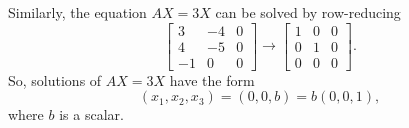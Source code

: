 \begin{solution}
  Similarly, the equation $AX = 3X$ can be solved by row-reducing
  \begin{equation*}
    \begin{bmatrix}
      3 & -4 & 0 \\
      4 & -5 & 0 \\
      -1 & 0 & 0
    \end{bmatrix}
    \rightarrow
    \begin{bmatrix}
      1 & 0 & 0 \\
      0 & 1 & 0 \\
      0 & 0 & 0
    \end{bmatrix}.
  \end{equation*}
  So, solutions of $AX = 3X$ have the form
  \begin{equation*}
    (x_1,x_2,x_3) = (0,0,b) = b(0,0,1),
  \end{equation*}
  where $b$ is a scalar.
\end{solution}
